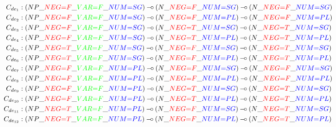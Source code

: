 \begin{align*}
C_{de_1} &: (NP\_\textcolor{red}{NEG{=}F}\_\textcolor{green}{VAR{=}F}\_\textcolor{blue}{NUM{=}SG}) \limp (N\_\textcolor{red}{NEG{=}F}\_\textcolor{blue}{NUM{=}SG}) \limp
(N\_\textcolor{red}{NEG{=}F}\_\textcolor{blue}{NUM{=}SG}) \\
C_{de_2} &: (NP\_\textcolor{red}{NEG{=}F}\_\textcolor{green}{VAR{=}F}\_\textcolor{blue}{NUM{=}SG}) \limp (N\_\textcolor{red}{NEG{=}F}\_\textcolor{blue}{NUM{=}PL}) \limp
(N\_\textcolor{red}{NEG{=}F}\_\textcolor{blue}{NUM{=}PL}) \\
C_{de_3} &: (NP\_\textcolor{red}{NEG{=}F}\_\textcolor{green}{VAR{=}F}\_\textcolor{blue}{NUM{=}SG}) \limp (N\_\textcolor{red}{NEG{=}T}\_\textcolor{blue}{NUM{=}SG}) \limp
(N\_\textcolor{red}{NEG{=}T}\_\textcolor{blue}{NUM{=}SG}) \\
C_{de_4} &: (NP\_\textcolor{red}{NEG{=}F}\_\textcolor{green}{VAR{=}F}\_\textcolor{blue}{NUM{=}SG}) \limp (N\_\textcolor{red}{NEG{=}T}\_\textcolor{blue}{NUM{=}PL}) \limp
(N\_\textcolor{red}{NEG{=}T}\_\textcolor{blue}{NUM{=}PL}) \\
C_{de_5} &: (NP\_\textcolor{red}{NEG{=}T}\_\textcolor{green}{VAR{=}F}\_\textcolor{blue}{NUM{=}SG}) \limp (N\_\textcolor{red}{NEG{=}F}\_\textcolor{blue}{NUM{=}SG}) \limp
(N\_\textcolor{red}{NEG{=}T}\_\textcolor{blue}{NUM{=}SG}) \\
C_{de_6} &: (NP\_\textcolor{red}{NEG{=}T}\_\textcolor{green}{VAR{=}F}\_\textcolor{blue}{NUM{=}SG}) \limp (N\_\textcolor{red}{NEG{=}F}\_\textcolor{blue}{NUM{=}PL}) \limp
(N\_\textcolor{red}{NEG{=}T}\_\textcolor{blue}{NUM{=}PL}) \\
C_{de_7} &: (NP\_\textcolor{red}{NEG{=}F}\_\textcolor{green}{VAR{=}F}\_\textcolor{blue}{NUM{=}PL}) \limp (N\_\textcolor{red}{NEG{=}F}\_\textcolor{blue}{NUM{=}SG}) \limp
(N\_\textcolor{red}{NEG{=}F}\_\textcolor{blue}{NUM{=}SG}) \\
C_{de_8} &: (NP\_\textcolor{red}{NEG{=}F}\_\textcolor{green}{VAR{=}F}\_\textcolor{blue}{NUM{=}PL}) \limp (N\_\textcolor{red}{NEG{=}F}\_\textcolor{blue}{NUM{=}PL}) \limp
(N\_\textcolor{red}{NEG{=}F}\_\textcolor{blue}{NUM{=}PL}) \\
C_{de_9} &: (NP\_\textcolor{red}{NEG{=}F}\_\textcolor{green}{VAR{=}F}\_\textcolor{blue}{NUM{=}PL}) \limp (N\_\textcolor{red}{NEG{=}T}\_\textcolor{blue}{NUM{=}SG}) \limp
(N\_\textcolor{red}{NEG{=}T}\_\textcolor{blue}{NUM{=}SG}) \\
C_{de_{10}} &: (NP\_\textcolor{red}{NEG{=}F}\_\textcolor{green}{VAR{=}F}\_\textcolor{blue}{NUM{=}PL}) \limp (N\_\textcolor{red}{NEG{=}T}\_\textcolor{blue}{NUM{=}PL}) \limp
(N\_\textcolor{red}{NEG{=}T}\_\textcolor{blue}{NUM{=}PL}) \\
C_{de_{11}} &: (NP\_\textcolor{red}{NEG{=}T}\_\textcolor{green}{VAR{=}F}\_\textcolor{blue}{NUM{=}PL}) \limp (N\_\textcolor{red}{NEG{=}F}\_\textcolor{blue}{NUM{=}SG}) \limp
(N\_\textcolor{red}{NEG{=}T}\_\textcolor{blue}{NUM{=}SG}) \\
C_{de_{12}} &: (NP\_\textcolor{red}{NEG{=}T}\_\textcolor{green}{VAR{=}F}\_\textcolor{blue}{NUM{=}PL}) \limp (N\_\textcolor{red}{NEG{=}F}\_\textcolor{blue}{NUM{=}PL}) \limp
(N\_\textcolor{red}{NEG{=}T}\_\textcolor{blue}{NUM{=}PL})
\end{align*}

